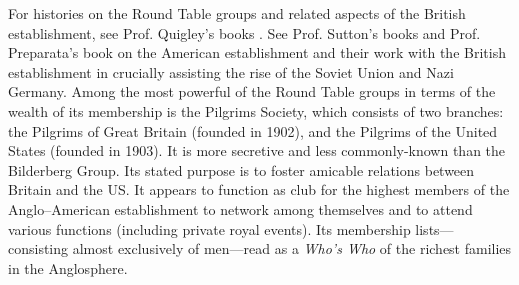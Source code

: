 \documentclass[letterpaper,12pt]{article}
\begin{document}
{    For histories on the Round Table groups and related aspects of the British establishment, see Prof. Quigley's books \cite{Quigley1966,Quigley1981}. See Prof. Sutton's books \cite{Sutton1968,Sutton1971,Sutton1973,Sutton1973b,Sutton1974,Sutton1976,Sutton1984,Sutton1986,Sutton1995} and Prof. Preparata's book \cite{Preparata2005} on the American establishment and their work with the British establishment in crucially assisting the rise of the Soviet Union and Nazi Germany. Among the most powerful of the Round Table groups in terms of the wealth of its membership is the Pilgrims Society, which consists of two branches: the Pilgrims of Great Britain (founded in 1902), and the Pilgrims of the United States (founded in 1903). It is more secretive and less commonly-known than the Bilderberg Group. Its stated purpose is to foster amicable relations between Britain and the US. It appears to function as club for the highest members of the Anglo--American establishment to network among themselves and to attend various functions (including private royal events). Its membership lists---consisting almost exclusively of men---read as a \emph{Who's Who} of the richest families in the Anglosphere.\par
}
\end{document}
